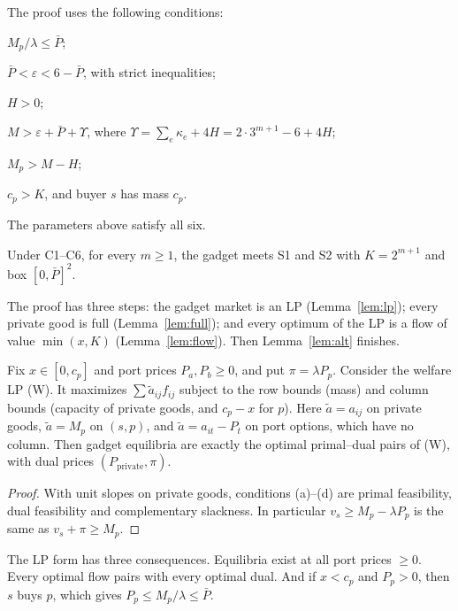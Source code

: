 The proof uses the following conditions:
\begin{description}[leftmargin=2.5em,itemsep=0pt]
\item[C1:] $M_p/\lambda\le\bar P$;
\item[C2:] $\bar P<\varepsilon<6-\bar P$, with strict inequalities;
\item[C3:] $H>0$;
\item[C4:] $M>\varepsilon+\bar P+\Upsilon$, where $\Upsilon=\sum_e\kappa_e+4H=2\cdot3^{m+1}-6+4H$;
\item[C5:] $M_p>M-H$;
\item[C6:] $c_p>K$, and buyer $s$ has mass $c_p$.
\end{description}
The parameters above satisfy all six.

\begin{theorem}\label{thm:gadget}
\statusrefereed
Under C1--C6, for every $m\ge1$, the gadget meets S1 and S2 with $K=2^{m+1}$ and box $[0,\bar P]^2$.
\end{theorem}

The proof has three steps: the gadget market is an LP (Lemma~\ref{lem:lp}); every private good is full
(Lemma~\ref{lem:full}); and every optimum of the LP is a flow of value $\min(x,K)$
(Lemma~\ref{lem:flow}). Then Lemma~\ref{lem:alt} finishes.

\begin{lemma}[LP form]\label{lem:lp}
Fix $x\in[0,c_p]$ and port prices $P_a,P_b\ge0$, and put $\pi=\lambda P_p$. Consider the welfare LP (W).
It maximizes $\sum\tilde a_{ij}f_{ij}$ subject to the row bounds (mass) and column bounds (capacity of
private goods, and $c_p-x$ for $p$). Here $\tilde a=a_{ij}$ on private goods, $\tilde a=M_p$ on $(s,p)$,
and $\tilde a=a_{it}-P_t$ on port options, which have no column. Then gadget equilibria are exactly the
optimal primal--dual pairs of (W), with dual prices $(P_{\text{private}},\pi)$.
\end{lemma}

\begin{proof}
With unit slopes on private goods, conditions (a)--(d) are primal feasibility, dual feasibility and
complementary slackness. In particular $v_s\ge M_p-\lambda P_p$ is the same as $v_s+\pi\ge M_p$.
\end{proof}

The LP form has three consequences. Equilibria exist at all port prices $\ge0$. Every optimal flow pairs
with every optimal dual. And if $x<c_p$ and $P_p>0$, then $s$ buys $p$, which gives
$P_p\le M_p/\lambda\le\bar P$.

